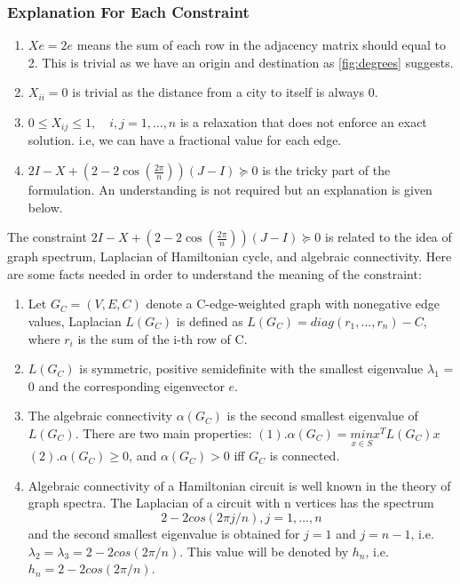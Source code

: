 \documentclass{article}
\begin{document}
\subsubsection{Explanation For Each Constraint}
\begin{enumerate}
    \item $Xe = 2e$ means the sum of each row in the adjacency matrix should equal to 2. This is trivial as we have an origin and destination as \ref{fig:degrees} suggests. 
    \item $X_{ii} = 0$ is trivial as the distance from a city to itself is always 0.
    \item $0 \leq X_{ij} \leq 1, \quad i,j = 1,\ldots,n$ is a relaxation that does not enforce an exact solution. i.e, we can have a fractional value for each edge.
    \item $2I - X + (2-2\cos\left(\frac{2\pi}{n}\right))(J-I) \succeq 0$ is the tricky part of the formulation. An understanding is not required but an explanation is given below.
\end{enumerate}
The constraint $2I - X + (2-2\cos\left(\frac{2\pi}{n}\right))(J-I) \succeq 0$ is related to the idea of graph spectrum, Laplacian of Hamiltonian cycle, and algebraic connectivity. Here are some facts needed in order to understand the meaning of the constraint:
\begin{enumerate}
    \item Let $ G_C = (V, E, C)$ denote a C-edge-weighted graph with nonegative edge values, Laplacian $L(G_C)$ is defined as $L(G_C) = diag(r_1,...,r_n)-C$, where $r_i$ is the sum of the i-th row of C.
    \item $L(G_C)$ is symmetric, positive semidefinite with the smallest eigenvalue $\lambda_1$ = 0 and the corresponding eigenvector $e$.
    \item The algebraic connectivity $\alpha(G_C)$ is the second smallest eigenvalue of $L(G_C)$. There are two main properties: $(1).\alpha(G_C) = \underset{x \in S}{min}x^TL(G_C)x$ \quad $(2).\alpha(G_C) \geq 0$, and $\alpha(G_C) > 0$ iff $G_C$ is connected. 
    \item Algebraic connectivity of a Hamiltonian circuit is well known in the theory of graph spectra. The Laplacian of a circuit with n vertices has the spectrum $$2-2 cos(2\pi j/n), j = 1,...,n$$
    and the second smallest eigenvalue is obtained for $j = 1$ and $j = n-1$, i.e. $\lambda_2 = \lambda_3 = 2-2cos(2\pi/n)$. This value will be denoted by $h_n$, i.e. $h_n = 2-2cos(2\pi/n)$.
\end{enumerate}
\end{document}
